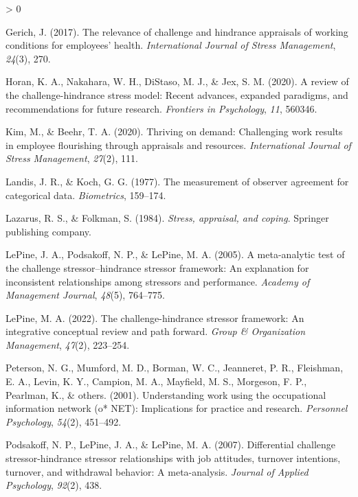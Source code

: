 \documentclass[
  english,
  man]{apa6}
\newlength{\cslhangindent}
\newenvironment{CSLReferences}[2] %
 {%
  \setlength{\parindent}{0pt}
  \ifodd #1 \everypar{\setlength{\hangindent}{\cslhangindent}}\ignorespaces\fi
  \ifnum #2 > 0
  \setlength{\parskip}{#2\baselineskip}
  \fi
 }%
 {}
\begin{document}
\begin{CSLReferences}{1}{0}
\leavevmode\hypertarget{ref-gerich2017relevance}{}%
Gerich, J. (2017). The relevance of challenge and hindrance appraisals of working conditions for employees' health. \emph{International Journal of Stress Management}, \emph{24}(3), 270.

\leavevmode\hypertarget{ref-horan2020review}{}%
Horan, K. A., Nakahara, W. H., DiStaso, M. J., \& Jex, S. M. (2020). A review of the challenge-hindrance stress model: Recent advances, expanded paradigms, and recommendations for future research. \emph{Frontiers in Psychology}, \emph{11}, 560346.

\leavevmode\hypertarget{ref-kim2020thriving}{}%
Kim, M., \& Beehr, T. A. (2020). Thriving on demand: Challenging work results in employee flourishing through appraisals and resources. \emph{International Journal of Stress Management}, \emph{27}(2), 111.

\leavevmode\hypertarget{ref-landis1977measurement}{}%
Landis, J. R., \& Koch, G. G. (1977). The measurement of observer agreement for categorical data. \emph{Biometrics}, 159--174.

\leavevmode\hypertarget{ref-lazarus1984stress}{}%
Lazarus, R. S., \& Folkman, S. (1984). \emph{Stress, appraisal, and coping}. Springer publishing company.

\leavevmode\hypertarget{ref-lepine2005meta}{}%
LePine, J. A., Podsakoff, N. P., \& LePine, M. A. (2005). A meta-analytic test of the challenge stressor--hindrance stressor framework: An explanation for inconsistent relationships among stressors and performance. \emph{Academy of Management Journal}, \emph{48}(5), 764--775.

\leavevmode\hypertarget{ref-lepine2022challenge}{}%
LePine, M. A. (2022). The challenge-hindrance stressor framework: An integrative conceptual review and path forward. \emph{Group \& Organization Management}, \emph{47}(2), 223--254.

\leavevmode\hypertarget{ref-peterson2001understanding}{}%
Peterson, N. G., Mumford, M. D., Borman, W. C., Jeanneret, P. R., Fleishman, E. A., Levin, K. Y., Campion, M. A., Mayfield, M. S., Morgeson, F. P., Pearlman, K., \& others. (2001). Understanding work using the occupational information network (o* NET): Implications for practice and research. \emph{Personnel Psychology}, \emph{54}(2), 451--492.

\leavevmode\hypertarget{ref-podsakoff2007differential}{}%
Podsakoff, N. P., LePine, J. A., \& LePine, M. A. (2007). Differential challenge stressor-hindrance stressor relationships with job attitudes, turnover intentions, turnover, and withdrawal behavior: A meta-analysis. \emph{Journal of Applied Psychology}, \emph{92}(2), 438.


\end{CSLReferences}
\end{document}
